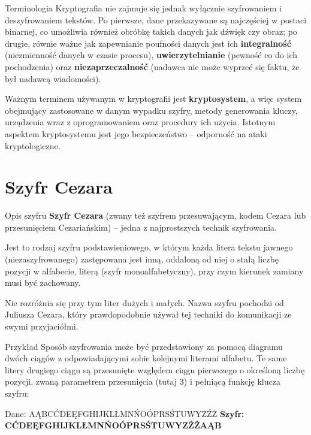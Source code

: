 \documentclass[10pt]{beamer}
\begin{document}
\begin{frame}[fragile]{Terminologia}
  Kryptografia nie zajmuje się jednak wyłącznie szyfrowaniem i deszyfrowaniem tekstów. Po pierwsze, dane przekazywane są najczęściej w postaci binarnej, co umożliwia również obróbkę takich danych jak dźwięk czy obraz; po drugie, równie ważne jak zapewnianie poufności danych jest ich \textbf{integralność} (niezmienność danych w czasie procesu), \textbf{uwierzytelnianie} (pewność co do ich pochodzenia) oraz \textbf{niezaprzeczalność} (nadawca nie może wyprzeć się faktu, że był nadawcą wiadomości).
  
  
  Ważnym terminem używanym w kryptografii jest \textbf{kryptosystem}, a więc system obejmujący zastosowane w danym wypadku szyfry, metody generowania kluczy, urządzenia wraz z oprogramowaniem oraz procedury ich użycia. Istotnym aspektem kryptosystemu jest jego bezpieczeństwo – odporność na ataki kryptologiczne.
\end{frame}

\section{Szyfr Cezara}

\begin{frame}{Opis szyfru}
	\textbf{Szyfr Cezara} (zwany też szyfrem przesuwającym, kodem Cezara lub przesunięciem Cezariańskim) – jedna z najprostszych technik szyfrowania.
	
	 Jest to rodzaj szyfru podstawieniowego, w którym każda litera tekstu jawnego (niezaszyfrowanego) zastępowana jest inną, oddaloną od niej o stałą liczbę pozycji w alfabecie, literą (szyfr monoalfabetyczny), przy czym kierunek zamiany musi być zachowany.
	 
	  Nie rozróżnia się przy tym liter dużych i małych. Nazwa szyfru pochodzi od Juliusza Cezara, który prawdopodobnie używał tej techniki do komunikacji ze swymi przyjaciółmi.
\end{frame}


\begin{frame}{Przykład}
	Sposób szyfrowania może być przedstawiony za pomocą diagramu dwóch ciągów z odpowiadającymi sobie kolejnymi literami alfabetu. Te same litery drugiego ciągu są przesunięte względem ciągu pierwszego o określoną liczbę pozycji, zwaną parametrem przesunięcia (tutaj 3) i pełniącą funkcję klucza szyfru:

\begin{block}{Dane:  AĄBCĆDEĘFGHIJKLŁMNŃOÓPRSŚTUWYZŹŻ}
        \textbf{Szyfr:  CĆDEĘFGHIJKLŁMNŃOÓPRSŚTUWYZŹŻAĄB}
      \end{block}
\end{frame}
\end{document}
